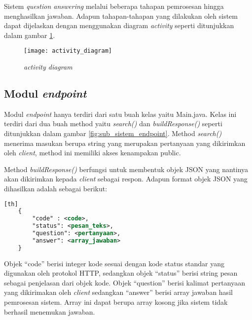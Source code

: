 Sistem \emph{question answering} melalui beberapa tahapan pemrosesan hingga menghasilkan jawaban. Adapun tahapan-tahapan yang dilakukan oleh sistem dapat dijelaskan dengan menggunakan diagram \emph{activity} seperti ditunjukkan dalam gambar \ref{fig:activity_diagram}.

\begin{figure}[hb]
    \centering
    \texttt{[image: activity\_diagram]}
    \caption{\emph{activity diagram}}
    \label{fig:activity_diagram}
\end{figure}


\subsection{Modul \emph{endpoint}}
Modul \emph{endpoint} hanya terdiri dari satu buah kelas yaitu Main.java. Kelas ini terdiri dari dua buah method yaitu \emph{search()} dan \emph{buildResponse()} seperti ditunjukkan dalam gambar \ref{fig:sub_sistem_endpoint}. Method \emph{search()} menerima masukan berupa string yang merupakan pertanyaan yang dikirimkan oleh \emph{client}, method ini memiliki akses kenampakan public.

Method \emph{buildResponse()} berfungsi untuk membentuk objek JSON yang nantinya akan dikirimkan kepada \emph{client} sebagai respon. Adapun format objek JSON yang dihasilkan adalah sebagai berikut:

\begin{lstlisting}[language=XML,xleftmargin=0pt][th]
    {
        "code" : <code>,
        "status": <pesan_teks>,
        "question": <pertanyaan>,
        "answer": <array_jawaban>
    }
\end{lstlisting}

Objek ``code'' berisi integer kode sesuai dengan kode status standar yang digunakan oleh protokol HTTP, sedangkan objek ``status'' berisi string pesan sebagai penjelasan dari objek kode. Objek ``question'' berisi kalimat pertanyaan yang dikirimakan oleh \emph{client} sedangkan ``answer'' berisi array jawaban hasil pemrosesan sistem. Array ini dapat berupa array kosong jika sistem tidak berhasil menemukan jawaban.

